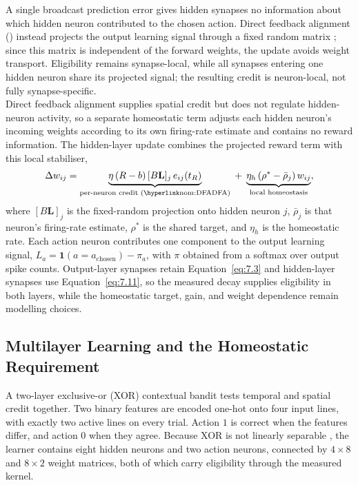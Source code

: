 \noindent A single broadcast prediction error gives hidden synapses no information about which hidden neuron
contributed to the chosen action. Direct feedback alignment () instead projects the output learning
signal through a fixed random matrix \cite{lillicrap2016random,nokland2016direct}; since this matrix is independent of
the forward weights, the update avoids weight transport. Eligibility remains synapse-local, while all synapses entering
one hidden neuron share its projected signal; the resulting credit is neuron-local, not fully synapse-specific.\\

\noindent Direct feedback alignment supplies spatial credit but does not regulate hidden-neuron activity, so a separate
homeostatic term adjusts each hidden neuron's incoming weights according to its own firing-rate estimate and contains no
reward information. The hidden-layer update combines the projected reward term with this local stabiliser,
\begin{align}
    \Delta w_{ij} = \underbrace{\eta\,(R-b)\,[B\mathbf{L}]_j\, e_{ij}(t_R)}_{\text{per-neuron credit (\abbrev{DFA})}} \;+\; \underbrace{\eta_h\,(\rho^{\ast} - \bar{\rho}_j)\, w_{ij}}_{\text{local homeostasis}}, \label{eq:7.11}
\end{align}
\noindent where $[B\mathbf{L}]_j$ is the fixed-random projection onto hidden neuron $j$, $\bar{\rho}_j$ is that
neuron's firing-rate estimate, $\rho^{\ast}$ is the shared target, and $\eta_h$ is the homeostatic rate. Each action
neuron contributes one component to the output learning signal,
$L_a=\mathbf{1}(a=a_{\mathrm{chosen}})-\pi_a$, with $\pi$ obtained from a softmax over output spike counts.
Output-layer synapses retain Equation~\ref{eq:7.3} and hidden-layer synapses use Equation~\ref{eq:7.11}, so the measured
decay supplies eligibility in both layers, while the homeostatic target, gain, and weight dependence remain modelling
choices.

\subsection[Multilayer Learning and the Homeostatic Requirement]{Multilayer Learning and the Homeostatic
Requirement}
\label{sec:7p3p2}

\noindent A two-layer exclusive-or (XOR) contextual bandit tests temporal and spatial credit together. Two binary
features are encoded one-hot onto four input lines, with exactly two active lines on every trial. Action $1$ is correct
when the features differ, and action $0$ when they agree. Because XOR is not linearly separable
\cite{rumelhart1986learning}, the learner contains eight hidden  neurons and two action neurons, connected by
$4\times8$ and $8\times2$ weight matrices, both of which carry eligibility through the measured kernel.\\

